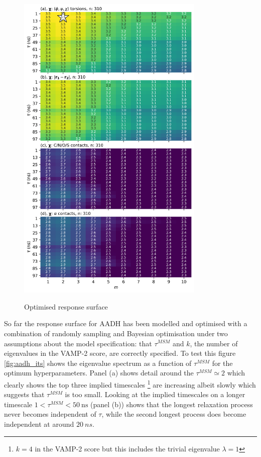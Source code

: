 \begin{figure}[!ht]
    \centering
    \caption{Optimised response surface}
    \includegraphics[width=0.8\textwidth]{chapters/msm_optimization/figures/aadh_response_surface_d_opt.png.png}
    \label{fig:aadh_rsm_opt}
\end{figure}



So far the response surface for AADH has been modelled and optimised with a combination of randomly sampling and Bayesian optimisation under two assumptions about the model specification: that $\tau^{MSM}$ and $k$, the number of eigenvalues in the VAMP-2 score, are correctly specified. To test this figure \ref{fig:aadh_its} shows the eigenvalue spectrum as a function of $\tau^{MSM}$ for the optimum hyperparameters. Panel (a) shows detail around the  $\tau^{MSM} \simeq 2$ which clearly shows the top three implied timescales \footnote{$k=4$ in the VAMP-2 score but this includes the trivial eigenvalue $\lambda = 1$} are increasing albeit slowly which suggests that $\tau^{MSM}$ is too small. Looking at the implied timescales on a longer timescale $1 < \tau^{MSM} < \SI{50}{\nano\second}$ (panel (b)) shows that the longest relaxation process never becomes independent of $\tau$, while the second longest process does become independent at around $\SI{20}{ns}$. 

